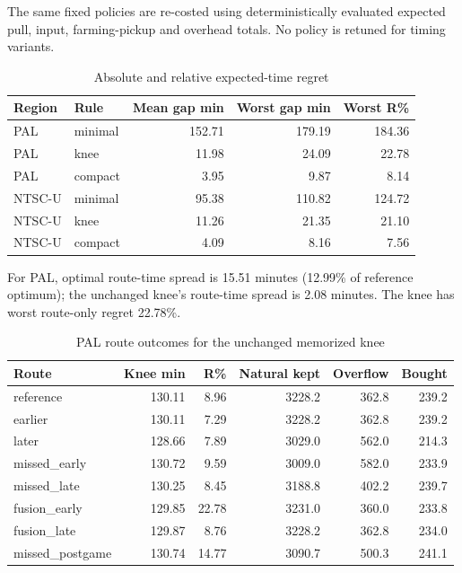 \documentclass[11pt]{article}
\theoremstyle{definition}\newtheorem{definition}[theorem]{Definition}
\begin{document}
The same fixed policies are re-costed using deterministically evaluated expected pull, input, farming-pickup and overhead totals. No policy is retuned for timing variants. \begin{table}[H]\centering\small
\begin{tabular}{llrrr}\toprule
Region & Rule & Mean gap min & Worst gap min & Worst R\%\\\midrule
PAL & minimal & 152.71 & 179.19 & 184.36\\
PAL & knee & 11.98 & 24.09 & 22.78\\
PAL & compact & 3.95 & 9.87 & 8.14\\
NTSC-U & minimal & 95.38 & 110.82 & 124.72\\
NTSC-U & knee & 11.26 & 21.35 & 21.10\\
NTSC-U & compact & 4.09 & 8.16 & 7.56\\
\bottomrule\end{tabular}
\caption{Absolute and relative expected-time regret}\label{tab:result-7}\end{table}
For PAL, optimal route-time spread is 15.51 minutes (12.99\% of reference optimum); the unchanged knee's route-time spread is 2.08 minutes. The knee has worst route-only regret 22.78\%. \begin{table}[H]\centering\small
\begin{tabular}{lrrrrr}\toprule
Route & Knee min & R\% & Natural kept & Overflow & Bought\\\midrule
reference & 130.11 & 8.96 & 3228.2 & 362.8 & 239.2\\
earlier & 130.11 & 7.29 & 3228.2 & 362.8 & 239.2\\
later & 128.66 & 7.89 & 3029.0 & 562.0 & 214.3\\
missed\_early & 130.72 & 9.59 & 3009.0 & 582.0 & 233.9\\
missed\_late & 130.25 & 8.45 & 3188.8 & 402.2 & 239.7\\
fusion\_early & 129.85 & 22.78 & 3231.0 & 360.0 & 233.8\\
fusion\_late & 129.87 & 8.76 & 3228.2 & 362.8 & 234.0\\
missed\_postgame & 130.74 & 14.77 & 3090.7 & 500.3 & 241.1\\
\bottomrule\end{tabular}
\caption{PAL route outcomes for the unchanged memorized knee}\label{tab:result-8}\end{table}
\end{document}
